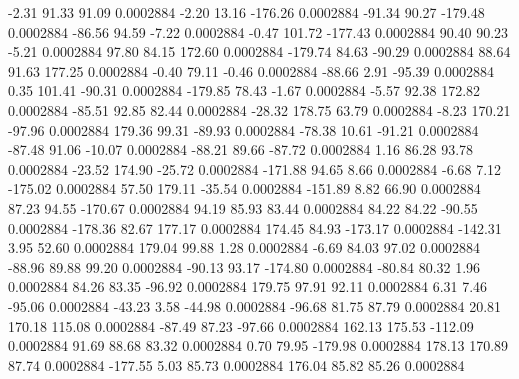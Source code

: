        -2.31       91.33       91.09     0.0002884
       -2.20       13.16     -176.26     0.0002884
      -91.34       90.27     -179.48     0.0002884
      -86.56       94.59       -7.22     0.0002884
       -0.47      101.72     -177.43     0.0002884
       90.40       90.23       -5.21     0.0002884
       97.80       84.15      172.60     0.0002884
     -179.74       84.63      -90.29     0.0002884
       88.64       91.63      177.25     0.0002884
       -0.40       79.11       -0.46     0.0002884
      -88.66        2.91      -95.39     0.0002884
        0.35      101.41      -90.31     0.0002884
     -179.85       78.43       -1.67     0.0002884
       -5.57       92.38      172.82     0.0002884
      -85.51       92.85       82.44     0.0002884
      -28.32      178.75       63.79     0.0002884
       -8.23      170.21      -97.96     0.0002884
      179.36       99.31      -89.93     0.0002884
      -78.38       10.61      -91.21     0.0002884
      -87.48       91.06      -10.07     0.0002884
      -88.21       89.66      -87.72     0.0002884
        1.16       86.28       93.78     0.0002884
      -23.52      174.90      -25.72     0.0002884
     -171.88       94.65        8.66     0.0002884
       -6.68        7.12     -175.02     0.0002884
       57.50      179.11      -35.54     0.0002884
     -151.89        8.82       66.90     0.0002884
       87.23       94.55     -170.67     0.0002884
       94.19       85.93       83.44     0.0002884
       84.22       84.22      -90.55     0.0002884
     -178.36       82.67      177.17     0.0002884
      174.45       84.93     -173.17     0.0002884
     -142.31        3.95       52.60     0.0002884
      179.04       99.88        1.28     0.0002884
       -6.69       84.03       97.02     0.0002884
      -88.96       89.88       99.20     0.0002884
      -90.13       93.17     -174.80     0.0002884
      -80.84       80.32        1.96     0.0002884
       84.26       83.35      -96.92     0.0002884
      179.75       97.91       92.11     0.0002884
        6.31        7.46      -95.06     0.0002884
      -43.23        3.58      -44.98     0.0002884
      -96.68       81.75       87.79     0.0002884
       20.81      170.18      115.08     0.0002884
      -87.49       87.23      -97.66     0.0002884
      162.13      175.53     -112.09     0.0002884
       91.69       88.68       83.32     0.0002884
        0.70       79.95     -179.98     0.0002884
      178.13      170.89       87.74     0.0002884
     -177.55        5.03       85.73     0.0002884
      176.04       85.82       85.26     0.0002884
